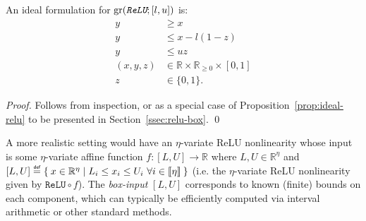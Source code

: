 \documentclass[smallextended]{svjour3}
\newcommand{\blue}[1]{{#1}}
\newcommand{\bbR}{\mathbb{R}}
\newcommand{\gr}{\operatorname{gr}}
\newcommand\defeq{\mathrel{\overset{\makebox[0pt]{\mbox{\normalfont\tiny\sffamily def}}}{=}}}
\newcommand{\ReLu}{\texttt{ReLU}}
\begin{document}
\begin{proposition}
    An ideal formulation for $\gr(\emph{\ReLu{}}; [l,u])$ is:
\begin{subequations} \label{eqn:univariate-max-big-M}
\begin{align}
    y &\geq x \label{eqn:univariate-max-big-M-1} \\
    y &\leq x - l(1-z) \\
    y &\leq uz \\
    (x,y,z) &\in \bbR \times \bbR_{\geq 0} \times [0,1] \label{eqn:univariate-max-big-M-4} \\
    z &\in \{0,1\}.
\end{align}
\end{subequations}
\end{proposition}
\begin{proof}
    Follows from inspection, or as a special case of Proposition~\ref{prop:ideal-relu} to be presented in Section~\ref{ssec:relu-box}.
\qed \end{proof}

A more realistic setting would have an \blue{$\eta$-variate} ReLU nonlinearity whose input is some \blue{$\eta$-variate} affine function $f : [L,U] \to \bbR$ \blue{where $L,U\in \bbR^\eta$ and $[L,U]\defeq\Set{ x \in \bbR^\eta | L_i \leq  x_i \leq U_i\  \forall i\in \llbracket \eta \rrbracket} $} \blue{(i.e. the $\eta$-variate ReLU nonlinearity given by $\ReLu{} \circ f$)}. The \blue{ \emph{box-input}  $[L,U]$} corresponds to known (finite) bounds on each component, which can typically be efficiently computed via interval arithmetic or other standard methods.
\end{document}
